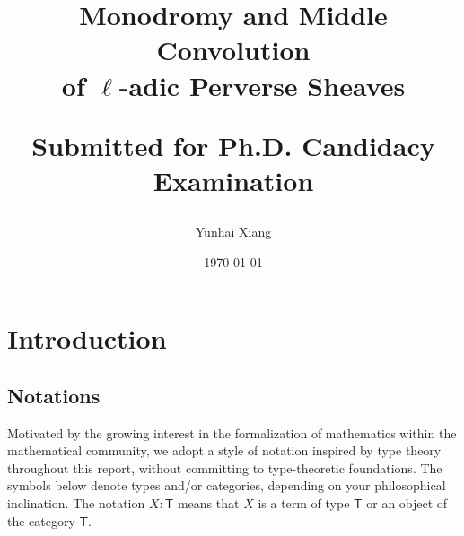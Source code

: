 \documentclass[11pt,letterpaper]{article}
\title{%
  {\fontsize{20}{25}\selectfont
  Monodromy and Middle Convolution\\
  of $\ell$-adic Perverse Sheaves\par}
  \vspace{0.55em}
  {\small Submitted for Ph.D. Candidacy Examination\par}%
}
\author{Yunhai Xiang}
\date{\today}
\theoremstyle{numberfirstplain}
\numberwithin{equation}{theorem}
\theoremstyle{numberfirstupright}
\begin{document}
\maketitle
\tableofcontents
\newpage

\section{Introduction}\label{sec:introduction}


\subsection{Notations}\label{subsec:notation-style}


Motivated by the growing interest in the formalization of mathematics within the mathematical community, we adopt a style of notation inspired by type theory throughout this report, without committing to type-theoretic foundations. The symbols below denote types and/or categories, depending on your philosophical inclination. The notation \(X:\mathsf{T}\) means that \(X\) is a term of type \(\mathsf{T}\) or an object of the category \(\mathsf{T}\).
\end{document}
